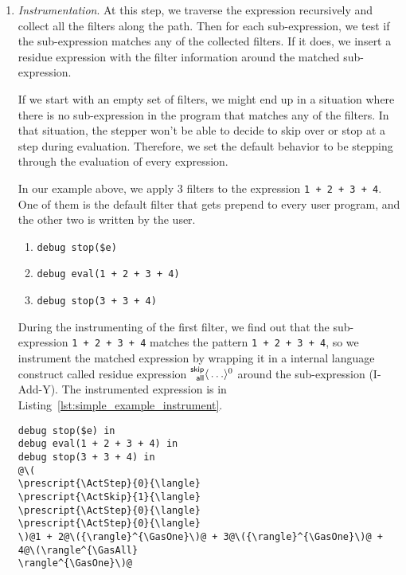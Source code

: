 \begin{enumerate}
\item \emph{Instrumentation}. \label{num:simple_example_instrument} At
  this step, we traverse the expression recursively and collect all
  the filters along the path. Then for each sub-expression, we test if
  the sub-expression matches any of the collected filters. If it does,
  we insert a residue expression with the filter information around
  the matched sub-expression.

  If we start with an empty set of filters, we might end up in a
  situation where there is no sub-expression in the program that
  matches any of the filters. In that situation, the stepper won't be
  able to decide to skip over or stop at a step during evaluation.
  Therefore, we set the default behavior to be stepping through the
  evaluation of every expression.

  In our example above, we apply 3 filters to the expression
  \lstinline[language=hazel]{1 + 2 + 3 + 4}. One of them is the
  default filter that gets prepend to every user program, and the
  other two is written by the user.

  \begin{enumerate}
  \item \lstinline[language=hazel]{debug stop($e)}
  \item \lstinline[language=hazel]{debug eval(1 + 2 + 3 + 4)}
  \item \lstinline[language=hazel]{debug stop(3 + 3 + 4)}
  \end{enumerate}

  During the instrumenting of the first filter, we find out that the
  sub-expression \lstinline[language=hazel]{1 + 2 + 3 + 4} matches the
  pattern \lstinline[language=hazel]{1 + 2 + 3 + 4}, so we instrument
  the matched expression by wrapping it in a internal language
  construct called residue expression
  \(\prescript{\mathsf{skip}}{\mathsf{all}}{\langle} \ldots \rangle^{0}\) around the sub-expression
  (I-Add-Y). The instrumented expression is in Listing~\ref{lst:simple_example_instrument}.

  \begin{lstlisting}[language=hazel,caption={Program after instrumentation},label={lst:simple_example_instrument}]
debug stop($e) in
debug eval(1 + 2 + 3 + 4) in
debug stop(3 + 3 + 4) in
@\(
\prescript{\ActStep}{0}{\langle}
\prescript{\ActSkip}{1}{\langle}
\prescript{\ActStep}{0}{\langle}
\prescript{\ActStep}{0}{\langle}
\)@1 + 2@\({\rangle}^{\GasOne}\)@ + 3@\({\rangle}^{\GasOne}\)@ + 4@\(\rangle^{\GasAll}
\rangle^{\GasOne}\)@\end{lstlisting}


\end{enumerate}
